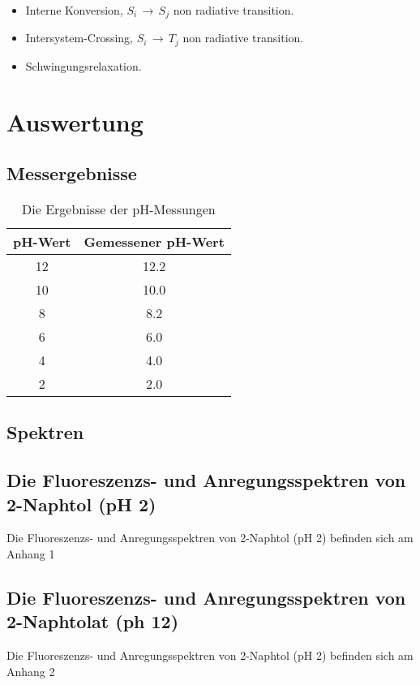 \documentclass[12pt]{article}
\begin{document}
\begin{itemize}
    \item[]  Interne Konversion,
        $S_i\,\longrightarrow\,S_j$ non radiative transition.

    \item[]  Intersystem-Crossing,
        $S_i\,\longrightarrow\,T_j$ non radiative transition.

    \item[]  
        Schwingungsrelaxation.
\end{itemize}


\section{Auswertung}
\subsection{Messergebnisse}
\begin{table}[!ht]
 \begin{tabular}{cc}
 pH-Wert & Gemessener pH-Wert   \\
\hline
12 &    12.2    \\
10 &  10.0 \\
8 & 8.2  \\
6 &  6.0 \\
4 & 4.0  \\
2 & 2.0  \\
\end{tabular}
\caption{ Die Ergebnisse der pH-Messungen}
\end{table}
\subsection{Spektren}
\subsection{Die Fluoreszenzs- und Anregungsspektren von 2-Naphtol (pH 2)}
Die Fluoreszenzs- und Anregungsspektren von 2-Naphtol (pH 2) befinden sich am Anhang 1
\subsection{Die Fluoreszenzs- und Anregungsspektren von 2-Naphtolat (ph 12)}
Die Fluoreszenzs- und Anregungsspektren von 2-Naphtol (pH 2) befinden sich am Anhang 2
\end{document}
